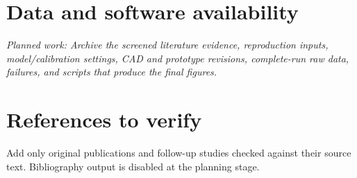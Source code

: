 \documentclass[11pt]{article}
\newcommand{\planned}[1]{\par\noindent\textit{Planned work: #1}\par}
\newif\ifBibliographyReady
\begin{document}
\section*{Data and software availability}
\planned{Archive the screened literature evidence, reproduction inputs,
model/calibration settings, CAD and prototype revisions, complete-run raw data,
failures, and scripts that produce the final figures.}

\ifBibliographyReady
  
  
\else
  \section*{References to verify}
  Add only original publications and follow-up studies checked against their
  source text. Bibliography output is disabled at the planning stage.
\fi
\end{document}

